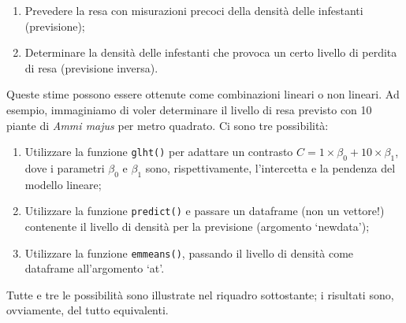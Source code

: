 \documentclass[
  12pt,
]{book}
\providecommand{\tightlist}{%
  \setlength{\itemsep}{0pt}\setlength{\parskip}{0pt}}
\begin{document}
\begin{enumerate}
\def\labelenumi{\arabic{enumi}.}
\tightlist
\item
  Prevedere la resa con misurazioni precoci della densità delle infestanti (previsione);
\item
  Determinare la densità delle infestanti che provoca un certo livello di perdita di resa (previsione inversa).
\end{enumerate}

Queste stime possono essere ottenute come combinazioni lineari o non lineari. Ad esempio, immaginiamo di voler determinare il livello di resa previsto con 10 piante di \emph{Ammi majus} per metro quadrato. Ci sono tre possibilità:

\begin{enumerate}
\def\labelenumi{\arabic{enumi}.}
\tightlist
\item
  Utilizzare la funzione \texttt{glht()} per adattare un contrasto \(C = 1 \times \beta_0 + 10 \times \beta_1\), dove i parametri \(\beta_0\) e \(\beta_1\) sono, rispettivamente, l'intercetta e la pendenza del modello lineare;
\item
  Utilizzare la funzione \texttt{predict()} e passare un dataframe (non un vettore!) contenente il livello di densità per la previsione (argomento `newdata');
\item
  Utilizzare la funzione \texttt{emmeans()}, passando il livello di densità come dataframe all'argomento `at'.
\end{enumerate}

Tutte e tre le possibilità sono illustrate nel riquadro sottostante; i risultati sono, ovviamente, del tutto equivalenti.
\end{document}
